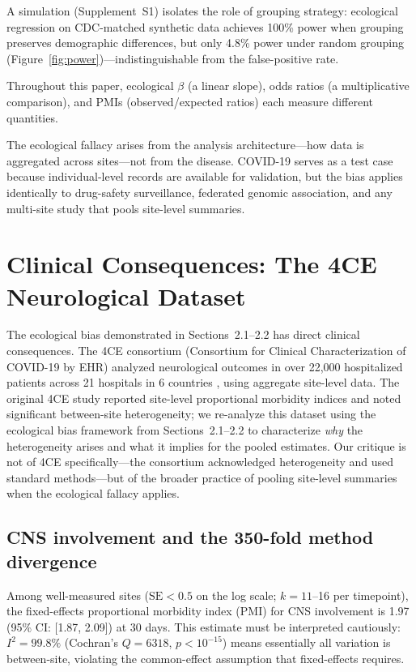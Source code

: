 \documentclass[11pt]{article}
\begin{document}
A simulation (Supplement~S1) isolates the role of grouping strategy:
ecological regression on CDC-matched synthetic data achieves 100\% power
when grouping preserves demographic differences, but only 4.8\% power
under random grouping (Figure~\ref{fig:power})---indistinguishable from
the false-positive rate.

Throughout this paper, ecological $\beta$ (a linear slope), odds ratios
(a multiplicative comparison), and PMIs (observed/expected ratios) each
measure different quantities.

The ecological fallacy arises from the analysis architecture---how data is
aggregated across sites---not from the disease.  COVID-19 serves as a test
case because individual-level records are available for validation, but
the bias applies identically to drug-safety surveillance, federated
genomic association, and any multi-site study that pools site-level
summaries.


\section{Clinical Consequences: The 4CE Neurological Dataset}

The ecological bias demonstrated in Sections~2.1--2.2 has direct clinical
consequences.  The 4CE consortium (Consortium for Clinical Characterization
of COVID-19 by EHR) analyzed neurological outcomes in over 22,000
hospitalized patients across 21 hospitals in 6 countries
\cite{four_ce_neuro2021}, using aggregate site-level data.  The original
4CE study reported site-level proportional morbidity indices and noted
significant between-site heterogeneity; we re-analyze this dataset
using the ecological bias framework from Sections~2.1--2.2 to characterize
\emph{why} the heterogeneity arises and what it implies for the pooled
estimates.  Our critique is not of 4CE specifically---the consortium
acknowledged heterogeneity and used standard methods---but of the broader
practice of pooling site-level summaries when the ecological fallacy applies.


\subsection{CNS involvement and the 350-fold method divergence}

Among well-measured sites ($\text{SE} < 0.5$ on the log scale; $k = 11$--16
per timepoint), the fixed-effects proportional morbidity index (PMI) for CNS
involvement is 1.97 (95\% CI: [1.87, 2.09]) at 30 days.  This estimate must
be interpreted cautiously: $I^2 = 99.8\%$ (Cochran's $Q = 6318$, $p <
10^{-15}$) means essentially all variation is between-site, violating the
common-effect assumption that fixed-effects requires.
\end{document}
